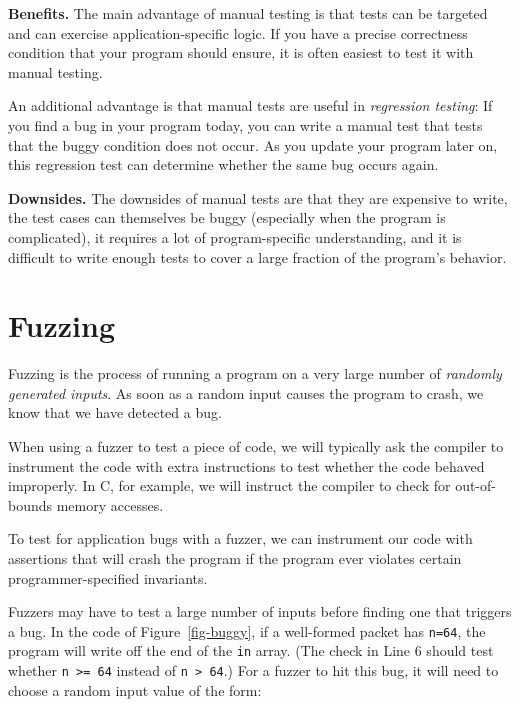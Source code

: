 \documentclass[
  letterpaper,
]{scrbook}
\theoremstyle{definition}
\theoremstyle{plain}
\theoremstyle{plain}
\theoremstyle{remark}
\begin{document}
\textbf{Benefits.} The main advantage of manual testing is that tests
can be targeted and can exercise application-specific logic. If you have
a precise correctness condition that your program should ensure, it is
often easiest to test it with manual testing.

An additional advantage is that manual tests are useful in
\emph{regression testing}: If you find a bug in your program today, you
can write a manual test that tests that the buggy condition does not
occur. As you update your program later on, this regression test can
determine whether the same bug occurs again.

\textbf{Downsides.} The downsides of manual tests are that they are
expensive to write, the test cases can themselves be buggy (especially
when the program is complicated), it requires a lot of program-specific
understanding, and it is difficult to write enough tests to cover a
large fraction of the program's behavior.

\section{Fuzzing}\label{fuzzing}

Fuzzing is the process of running a program on a very large number of
\emph{randomly generated inputs}. As soon as a random input causes the
program to crash, we know that we have detected a bug.

When using a fuzzer to test a piece of code, we will typically ask the
compiler to instrument the code with extra instructions to test whether
the code behaved improperly. In C, for example, we will instruct the
compiler to check for out-of-bounds memory accesses.


To test for application bugs with a fuzzer, we can instrument our code
with assertions that will crash the program if the program ever violates
certain programmer-specified invariants.

Fuzzers may have to test a large number of inputs before finding one
that triggers a bug. In the code of Figure~\ref{fig-buggy}, if a
well-formed packet has \texttt{n=64}, the program will write off the end
of the \texttt{in} array. (The check in Line 6 should test whether
\texttt{n\ \textgreater{}=\ 64} instead of
\texttt{n\ \textgreater{}\ 64}.) For a fuzzer to hit this bug, it will
need to choose a random input value of the form:
\end{document}

